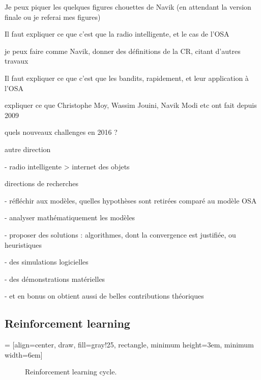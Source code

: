 Je peux piquer les quelques figures chouettes de Navik (en attendant la version finale ou je referai mes figures)

Il faut expliquer ce que c'est que la radio intelligente, et le cas de l'OSA

je peux faire comme Navik, donner des définitions de la CR, citant d'autres travaux

Il faut expliquer ce que c'est que les bandits, rapidement, et leur application à l'OSA

expliquer ce que Christophe Moy, Wassim Jouini, Navik Modi etc ont fait depuis 2009


quels nouveaux challenges en 2016 ?

autre direction

- radio intelligente > internet des objets


directions de recherches

- réfléchir aux modèles, quelles hypothèses sont retirées comparé au modèle OSA

- analyser mathématiquement les modèles

- proposer des solutions : algorithmes, dont la convergence est justifiée, ou heuristiques

- des simulations logicielles

- des démonstrations matérielles

- et en bonus on obtient aussi de belles contributions théoriques


\subsection{Reinforcement learning}

 = [align=center, draw, fill=gray!25, rectangle, minimum height=3em, minimum width=6em]
\begin{figure}[h!]
    \centering
\caption{Reinforcement learning cycle.}
\label{fig:1:ReinforcementLearningCycle}
\end{figure}

